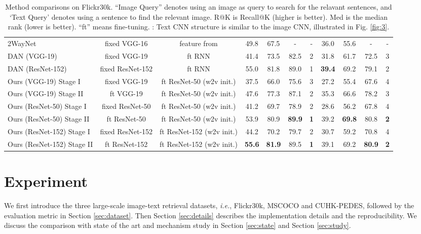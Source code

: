 \documentclass[10pt,final,journal]{IEEEtran}
\newcommand{\ie}{\mbox{\emph{i.e.}}}
\begin{document}
\begin{table*}
\begin{center}
\begin{tabular}{l|c|c|cccc|cccc}
2WayNet \cite{eisenschtat2016linking} &  fixed VGG-16 & feature from \cite{klein2015associating} &49.8 & 67.5 & - & - & 36.0 & 55.6 & - & - \\
DAN (VGG-19) \cite{nam2016dual}  & fixed VGG-19& ft RNN & 41.4 & 73.5 & 82.5 & 2 & 31.8 & 61.7 & 72.5 & 3 \\
DAN (ResNet-152) \cite{nam2016dual}  & fixed ResNet-152& ft RNN & 55.0 & 81.8 & 89.0 & 1 & \textbf{39.4} & 69.2 & 79.1 & 2 \\
\hline
Ours (VGG-19) Stage I  & fixed VGG-19& ft ResNet-50 (w2v init.)& 37.5 & 66.0 & 75.6 & 3 & 27.2 & 55.4 &  67.6 & 4\\
Ours (VGG-19) Stage II  & ft VGG-19& ft ResNet-50 (w2v init.)& 47.6 & 77.3 & 87.1 & 2 & 35.3 & 66.6 & 78.2 & 3 \\
Ours (ResNet-50) Stage I  & fixed ResNet-50& ft ResNet-50 (w2v init.)& 41.2 & 69.7 & 78.9 & 2 & 28.6 & 56.2 & 67.8 & 4\\
Ours (ResNet-50) Stage II  & ft ResNet-50 & ft ResNet-50 (w2v init.)& 53.9 & 80.9 & \textbf{89.9} & \textbf{1} & 39.2 & \textbf{69.8} & 80.8 & \textbf{2}\\
Ours (ResNet-152) Stage I  & fixed ResNet-152& ft ResNet-152 (w2v init.)& 44.2 & 70.2 & 79.7 & 2 & 30.7 & 59.2 & 70.8 & 4\\
Ours (ResNet-152) Stage II  & ft ResNet-152& ft ResNet-152 (w2v init.)& \textbf{55.6} & \textbf{81.9} & 89.5 & \textbf{1} & 39.1 & 69.2 &  \textbf{80.9} & \textbf{2} \\
\hline
\end{tabular}
\end{center}
\caption{Method comparisons on Flickr30k. ``Image Query'' denotes using an image  as query to search for the relavant sentences, and `Text Query' denotes using a sentence to find the relevant image. R@K is Recall@K (higher is better). Med  is the median rank (lower is better). ``ft'' means fine-tuning. : Text CNN structure is similar to the image CNN, illustrated in Fig. \ref{fig:3}. }
\label{table:Flickr30k}
\end{table*}
\section{Experiment} \label{sec:experiments}
We first introduce the three large-scale image-text retrieval datasets, \ie, Flickr30k, MSCOCO and CUHK-PEDES, followed by the evaluation metric in Section \ref{sec:dataset}. Then Section \ref{sec:details} describes the implementation details and the reproducibility. We discuss the comparison with state of the art and mechanism study in Section \ref{sec:state} and Section \ref{sec:study}.
\end{document}
